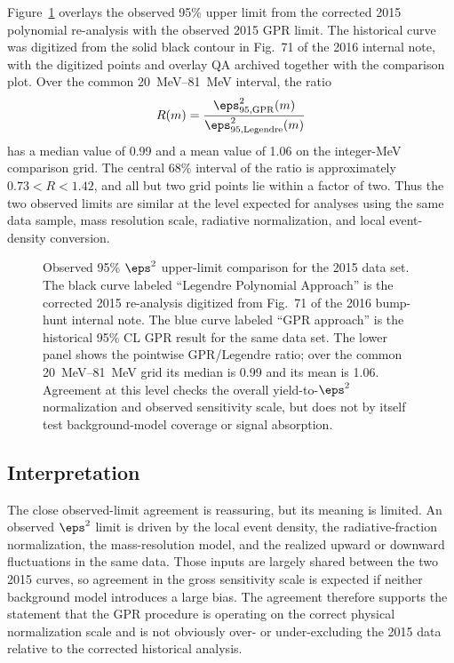 Figure~\ref{fig:hps2015-legendre-gpr-observed} overlays the observed 95\% upper limit
from the corrected 2015 polynomial re-analysis with the observed 2015 GPR limit.  The
historical curve was digitized from the solid black contour in Fig.~71 of the 2016
internal note, with the digitized points and overlay QA archived together with the
comparison plot.  Over the common \SIrange{20}{81}{MeV} interval, the ratio
\[
R(m) = \frac{\eps^2_{95,\mathrm{GPR}}(m)}
{\eps^2_{95,\mathrm{Legendre}}(m)}
\]
has a median value of 0.99 and a mean value of 1.06 on the integer-MeV comparison
grid.  The central 68\% interval of the ratio is approximately
$0.73<R<1.42$, and all but two grid points lie within a factor of two.  Thus the two
observed limits are similar at the level expected for analyses using the same data
sample, mass resolution scale, radiative normalization, and local event-density
conversion.

\begin{figure}[p]
\centering
{}
\caption{Observed 95\% $\eps^2$ upper-limit comparison for the 2015 data set.  The
black curve labeled ``Legendre Polynomial Approach'' is the corrected 2015
re-analysis digitized from Fig.~71 of the 2016 bump-hunt internal note.  The blue curve
labeled ``GPR approach'' is the historical 95\% CL GPR result for the same data set.
The lower panel shows the pointwise GPR/Legendre ratio; over the common
\SIrange{20}{81}{MeV} grid its median is 0.99 and its mean is 1.06. Agreement at this
level checks the overall yield-to-$\eps^2$ normalization and observed sensitivity
scale, but does not by itself test background-model coverage or signal absorption.}
\label{fig:hps2015-legendre-gpr-observed}
\end{figure}

\subsection{Interpretation}

The close observed-limit agreement is reassuring, but its meaning is limited.  An
observed $\eps^2$ limit is driven by the local event density, the radiative-fraction
normalization, the mass-resolution model, and the realized upward or downward
fluctuations in the same data.  Those inputs are largely shared between the two 2015
curves, so agreement in the gross sensitivity scale is expected if neither background
model introduces a large bias.  The agreement therefore supports the statement that the
GPR procedure is operating on the correct physical normalization scale and is not
obviously over- or under-excluding the 2015 data relative to the corrected historical
analysis.

